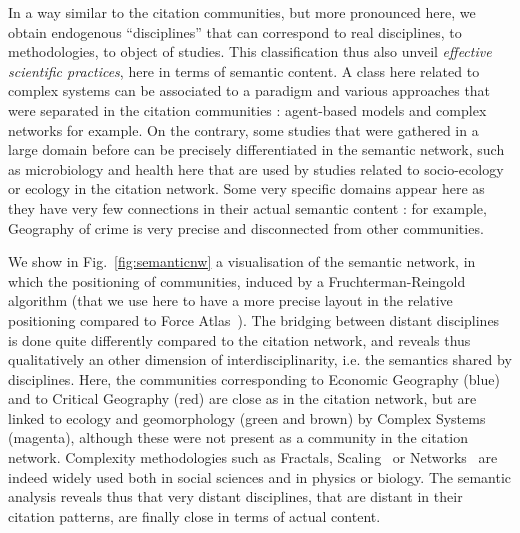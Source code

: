 In a way similar to the citation communities, but more pronounced here, we obtain endogenous ``disciplines'' that can correspond to real disciplines, to methodologies, to object of studies. This classification thus also unveil \emph{effective scientific practices}, here in terms of semantic content. A class here related to complex systems can be associated to a paradigm and various approaches that were separated in the citation communities : agent-based models and complex networks for example. On the contrary, some studies that were gathered in a large domain before can be precisely differentiated in the semantic network, such as microbiology and health here that are used by studies related to socio-ecology or ecology in the citation network. Some very specific domains appear here as they have very few connections in their actual semantic content : for example, Geography of crime is very precise and disconnected from other communities.


We show in Fig.~\ref{fig:semanticnw} a visualisation of the semantic network, in which the positioning of communities, induced by a Fruchterman-Reingold algorithm (that we use here to have a more precise layout in the relative positioning compared to Force Atlas~\citep{jacomy2014forceatlas2}). The bridging between distant disciplines is done quite differently compared to the citation network, and reveals thus qualitatively an other dimension of interdisciplinarity, i.e. the semantics shared by disciplines. Here, the communities corresponding to Economic Geography (blue) and to Critical Geography (red) are close as in the citation network, but are linked to ecology and geomorphology (green and brown) by Complex Systems (magenta), although these were not present as a community in the citation network. Complexity methodologies such as Fractals, Scaling~\citep{west2017scale} or Networks~\citep{newman2003structure} are indeed widely used both in social sciences and in physics or biology. The semantic analysis reveals thus that very distant disciplines, that are distant in their citation patterns, are finally close in terms of actual content. 



